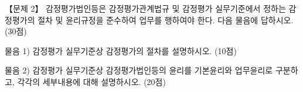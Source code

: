\begin{longquestion}{【문제 2】}
감정평가법인등은 감정평가관계법규 및 감정평가 실무기준에서 정하는 감정평가의 절차 및 윤리규정을 준수하여 업무를 행하여야 한다. 다음 물음에 답하시오. (30점) \par
\medskip\noindent 물음 1) 감정평가 실무기준상 감정평가의 절차를 설명하시오. (10점) \par
\medskip\noindent 물음 2) 감정평가 실무기준상 감정평가법인등의 윤리를 기본윤리와 업무윤리로 구분하고, 각각의 세부내용에 대해 설명하시오. (20점) \par
\end{longquestion}
